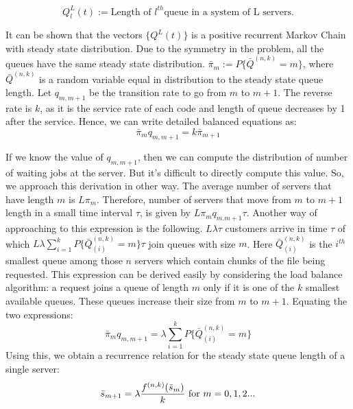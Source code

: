 \documentclass{article}
\begin{document}
\begin{equation}
Q^{L}_l(t):= \text{Length of } l^{th} \text{queue in a system of L servers.}
\label{3}
\end{equation} 

It can be shown that the vectors $\{ Q^{L}(t)\} $ is a positive recurrent Markov Chain with steady state distribution. Due to the symmetry in the problem, all the queues have the same steady state distribution. $ \bar{\pi}_m := P\{\bar{Q}^{(n,k)} = m\}  $, where $ \bar{Q}^{(n,k)} $ is a random variable equal in distribution to the steady state queue length. Let $q_{m,m+1}$ be the transition rate to go from $m$ to $m+1$.  The reverse rate is $ k $, as it is the service rate of each code and length of queue decreases by 1 after the service. Hence, we can write detailed balanced equations as: 
\begin{equation}
\bar{\pi}_mq_{m,m+1}=k\bar{\pi}_{m+1}
\end{equation}

If we know the value of $q_{m,m+1}$, then we can compute the distribution of number of waiting jobs at the server. But it's difficult to directly compute this value. So, we approach this derivation in other way. The average number of servers that have length $m$ is $L\pi_{m}$. Therefore, number of servers that move from $m$ to $m+1$ length in a small time interval $ \tau $, is given by $L\pi_{m}q_{m.m+1}\tau$. Another way of approaching to this expression is the following. $ L\lambda\tau$ customers arrive in time $\tau$ of which $ L\lambda\sum_{i=1}^{k}P\{\bar{Q}^{(n,k)}_{(i)}=m\}\tau$ join queues with size $ m $. Here $\bar{Q}^{(n,k)}_{(i)}$ is the $ i^{th} $ smallest queue among those $ n $ servers which contain chunks of the file being requested. This expression can be derived easily by considering the load balance algorithm: a request joins a queue of length $ m $ only if it is one of the $ k $ smallest available queues. These queues increase their size from $ m $ to $ m+1 $. Equating the two expressions:
\begin{equation}
\bar{\pi}_mq_{m,m+1}=\lambda \sum_{i=1}^{k}P\{\bar{Q}^{(n,k)}_{(i)}=m\}
\end{equation}
Using this, we obtain a recurrence relation for the steady state queue length of a single server:
\begin{equation}\label{dist}
\bar{s}_{m+1}=\lambda \frac{f^{(n,k)}(\bar{s}_{m})}{k} \text{ for } m=0,1,2...\\
\end{equation}
\end{document}
